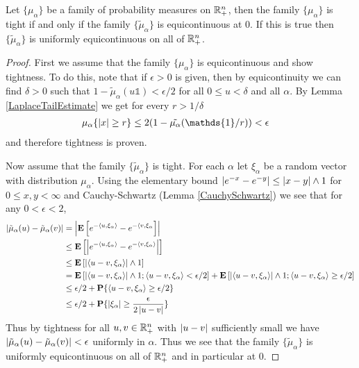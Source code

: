 \begin{lem}\label{LaplaceEquicontinuityAndTightness}Let $\lbrace
  \mu_\alpha \rbrace$
  be a family of probability measures on $\mathbb{R}^n_+$, then the family
  $\lbrace \mu_\alpha \rbrace$ is tight if and only if the family
  $\lbrace \tilde{\mu}_\alpha \rbrace$ is equicontinuous at $0$.  If
  this is true then $\lbrace \tilde{\mu}_\alpha \rbrace$ is uniformly equicontinuous on all of $\mathbb{R}^n_+$.
\end{lem}
\begin{proof}
First we assume that the family $\lbrace \mu_\alpha \rbrace$ is
equicontinuous and show tightness.  To do this, note that if $\epsilon
> 0$ is given,
 then by equicontinuity we can find
$\delta>0$ such that $1 - \tilde{\mu}_\alpha(u \mathds{1}) < \epsilon/2$ for all
$0 \leq u < \delta$ and all $\alpha$.  By Lemma
\ref{LaplaceTailEstimate} we get for every $r > 1/\delta$ 
\begin{align*}
\mu_\alpha\lbrace \abs{x} \geq r \rbrace &\leq 2 (1 - \tilde{\mu_\alpha}(\mathds{1}/r)) < \epsilon
\end{align*}
and therefore tightness is proven. 

Now assume that the family $\lbrace \tilde{\mu}_\alpha \rbrace$ is
tight.  For each $\alpha$ let $\xi_\alpha$ be a random vector with
distribution $\mu_\alpha$.  Using the elementary bound $\left \vert e^{-x} - e^{-y} \right \vert \leq \left \vert x
  -y \right \vert \wedge 1$ for $0 \leq x,y < \infty$ and Cauchy-Schwartz (Lemma
\ref{CauchySchwartz}) we see that for any
$0 < \epsilon < 2$,
\begin{align*}
\left \vert \tilde{\mu}_\alpha(u) - \tilde{\mu}_\alpha(v) \right \vert &=
\left \vert \textbf{E}\left[ e^{-\langle u, \xi_\alpha \rangle} - e^{-\langle v,
      \xi_\alpha}\right] \right \vert \\ 
&\leq
\textbf{E}\left[\left \vert  e^{-\langle u, \xi_\alpha \rangle} - e^{-\langle v,
      \xi_\alpha \rangle} \right \vert\right] \\ 
&\leq \textbf{E}\left[\left \vert \langle u-v, \xi_\alpha \rangle \right \vert \wedge 1\right] \\ 
&= \textbf{E}\left[\left \vert \langle u-v, \xi_\alpha \rangle \right \vert \wedge 1 ;
  \langle u-v, \xi_\alpha \rangle < \epsilon/2\right]  + 
\textbf{E}\left[\left \vert \langle u-v, \xi_\alpha \rangle \right \vert \wedge 1 ;
  \langle u-v, \xi_\alpha \rangle \geq \epsilon/2\right] \\ 
&\leq \epsilon/2 + 
\textbf{P}\{\langle u-v, \xi_\alpha \rangle \geq \epsilon/2\} \\ 
&\leq \epsilon/2 + 
\textbf{P}\{\left \vert \xi_\alpha  \right \vert \geq \frac{\epsilon}{2\left \vert u-v \right \vert}\} \\ 
\end{align*}
Thus by tightness for all $u,v \in \mathbb{R}^n_+$ with $\left \vert u-v \right \vert$
sufficiently small we have $\left \vert \tilde{\mu}_\alpha(u) -
  \tilde{\mu}_\alpha(v) \right \vert < \epsilon$ uniformly in $\alpha$.  Thus we see that
the family
$\lbrace \tilde{\mu}_\alpha \rbrace$ is uniformly equicontinuous on
all of $\mathbb{R}^n_+$ and in particular at $0$.
\end{proof}


